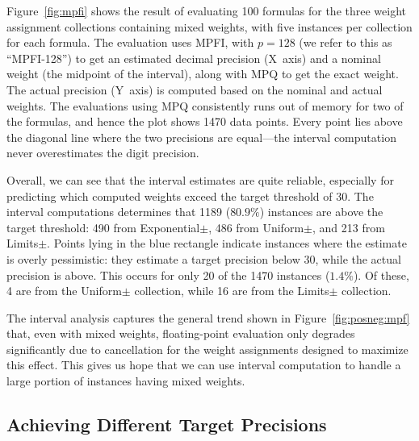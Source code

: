 \documentclass{easychair}
\begin{document}
Figure~\ref{fig:mpfi} shows the result of evaluating 100 formulas for
the three weight assignment collections containing mixed weights,
with five instances per collection for each formula.  
The evaluation uses
MPFI, with $p=128$ (we refer to this as ``MPFI-128'') to get an estimated decimal precision (X~axis) and
a nominal weight (the midpoint of the interval), along with MPQ to get
the exact weight.  The actual precision (Y~axis) is computed based on the
nominal and actual weights.  The evaluations using MPQ consistently runs out of
memory for two of the formulas, and hence the plot shows 1470
data points.  
Every point lies above the diagonal line where the two precisions are equal---the interval computation never overestimates the digit
precision.

Overall, we can see that the interval estimates are quite reliable,
especially for predicting which computed weights exceed the target
threshold of 30.
The
interval computations determines that 1189 ($80.9\%$) instances are
above the target threshold: 490 from \textsf{Exponential$\pm$}, 486 from
\textsf{Uniform$\pm$}, and 213 from \textsf{Limits$\pm$}.
Points lying in the blue rectangle
indicate instances where the estimate is overly pessimistic: they
estimate a target precision below 30, while the actual precision is
above.  This occurs for only 20 of the 1470 instances ($1.4\%$).  Of
these, 4 are from the \textsf{Uniform$\pm$} collection, while 16 are
from the \textsf{Limits$\pm$} collection.  

The interval analysis captures the general trend shown in
Figure~\ref{fig:posneg:mpf} that, even with mixed
weights, floating-point evaluation only degrades significantly due to cancellation
for the weight assignments designed to maximize
this effect.  This gives us hope that we can use interval computation
to handle a large portion of instances having mixed weights.

\subsection{Achieving Different Target Precisions}
\label{sect:precision:mixed}
\end{document}
